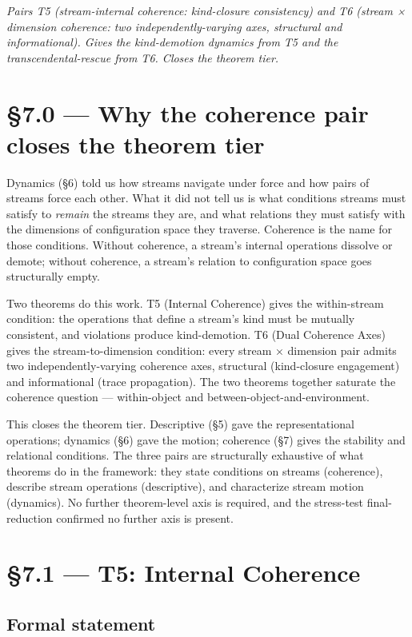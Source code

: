 \documentclass[11pt, openany]{book}
\newcommand{\sectionbreak}{\clearpage}
\begin{document}
\textit{Pairs T5 (stream-internal coherence: kind-closure consistency) and T6 (stream × dimension coherence: two independently-varying axes, structural and informational). Gives the kind-demotion dynamics from T5 and the transcendental-rescue from T6. Closes the theorem tier.}

\sectionbreak

\section{§7.0 --- Why the coherence pair closes the theorem tier}

Dynamics (§6) told us how streams navigate under force and how pairs of streams force each other. What it did not tell us is what conditions streams must satisfy to \textit{remain} the streams they are, and what relations they must satisfy with the dimensions of configuration space they traverse. Coherence is the name for those conditions. Without coherence, a stream's internal operations dissolve or demote; without coherence, a stream's relation to configuration space goes structurally empty.

Two theorems do this work. T5 (Internal Coherence) gives the within-stream condition: the operations that define a stream's kind must be mutually consistent, and violations produce kind-demotion. T6 (Dual Coherence Axes) gives the stream-to-dimension condition: every stream × dimension pair admits two independently-varying coherence axes, structural (kind-closure engagement) and informational (trace propagation). The two theorems together saturate the coherence question --- within-object and between-object-and-environment.

This closes the theorem tier. Descriptive (§5) gave the representational operations; dynamics (§6) gave the motion; coherence (§7) gives the stability and relational conditions. The three pairs are structurally exhaustive of what theorems do in the framework: they state conditions on streams (coherence), describe stream operations (descriptive), and characterize stream motion (dynamics). No further theorem-level axis is required, and the stress-test final-reduction confirmed no further axis is present.

\sectionbreak

\section{§7.1 --- T5: Internal Coherence}

\subsection{Formal statement}
\end{document}
